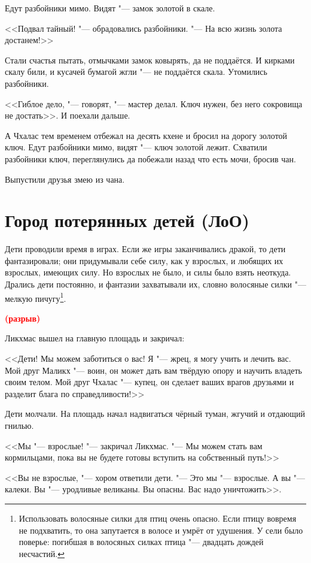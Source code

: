 \documentclass[a4paper,10pt]{book}
\newcommand{\spacing}{\textcolor{red}{\textbf{(разрыв)}}}
\begin{document}
Едут разбойники мимо. Видят "--- замок золотой в скале. 

<<Подвал тайный! "--- обрадовались разбойники. "--- На всю жизнь золота достанем!>>

Стали счастья пытать, отмычками замок ковырять, да не поддаётся. И кирками скалу били, и кусачей бумагой жгли "--- не поддаётся скала. Утомились разбойники.

<<Гиблое дело, "--- говорят, "--- мастер делал. Ключ нужен, без него сокровища не достать>>. И поехали дальше.

А Чхалас тем временем отбежал на десять кхене и бросил на дорогу золотой ключ. Едут разбойники мимо, видят "--- ключ золотой лежит. Схватили разбойники ключ, переглянулись да побежали назад что есть мочи, бросив чан.

Выпустили друзья змею из чана.

\section{Город потерянных детей (ЛоО)}

Дети проводили время в играх. Если же игры заканчивались дракой, то дети фантазировали; они придумывали себе силу, как у взрослых, и любящих их взрослых, имеющих силу. Но взрослых не было, и силы было взять неоткуда. Дрались дети постоянно, и фантазии захватывали их, словно волосяные силки "--- мелкую пичугу\footnote{Использовать волосяные силки для птиц очень опасно. Если птицу вовремя не подхватить, то она запутается в волосе и умрёт от удушения. У сели было поверье: погибшая в волосяных силках птица "--- двадцать дождей несчастий.}.

\spacing

Ликхмас вышел на главную площадь и закричал:

<<Дети! Мы можем заботиться о вас! Я "--- жрец, я могу учить и лечить вас. Мой друг Маликх "--- воин, он может дать вам твёрдую опору и научить владеть своим телом. Мой друг Чхалас "--- купец, он сделает ваших врагов друзьями и разделит блага по справедливости!>>

Дети молчали. На площадь начал надвигаться чёрный туман, жгучий и отдающий гнилью.

<<Мы "--- взрослые! "--- закричал Ликхмас. "--- Мы можем стать вам кормильцами, пока вы не будете готовы вступить на собственный путь!>>

<<Вы не взрослые, "--- хором ответили дети. "--- Это мы "--- взрослые. А вы "--- калеки. Вы "--- уродливые великаны. Вы опасны. Вас надо уничтожить>>.
\end{document}
